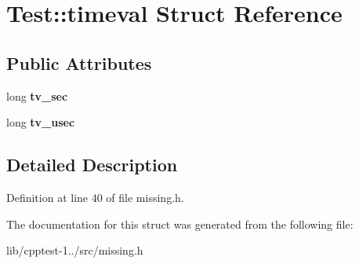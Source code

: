 \hypertarget{struct_test_1_1timeval}{}\section{Test\+:\+:timeval Struct Reference}
\label{struct_test_1_1timeval}
\subsection*{Public Attributes}
\begin{DoxyCompactItemize}
\item 
long {\bfseries tv\+\_\+sec}\hypertarget{struct_test_1_1timeval_aca8cda492ba177e613667cc1d78e06d4}{}\label{struct_test_1_1timeval_aca8cda492ba177e613667cc1d78e06d4}

\item 
long {\bfseries tv\+\_\+usec}\hypertarget{struct_test_1_1timeval_a0d2f1f637ec31de63b2085cae7973e8a}{}\label{struct_test_1_1timeval_a0d2f1f637ec31de63b2085cae7973e8a}

\end{DoxyCompactItemize}


\subsection{Detailed Description}


Definition at line 40 of file missing.\+h.



The documentation for this struct was generated from the following file\+:\begin{DoxyCompactItemize}
\item 
lib/cpptest-\/1../src/missing.\+h\end{DoxyCompactItemize}
